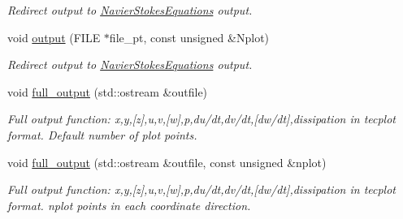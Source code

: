 \begin{DoxyCompactItemize}
\begin{DoxyCompactList}\small\item\em Redirect output to \hyperlink{classoomph_1_1NavierStokesEquations}{Navier\+Stokes\+Equations} output. \end{DoxyCompactList}\item 
void \hyperlink{classoomph_1_1PolarCrouzeixRaviartElement_a0e5c165c36dacf83709bd8c6fba1be40}{output} (F\+I\+LE $\ast$file\+\_\+pt, const unsigned \&Nplot)
\begin{DoxyCompactList}\small\item\em Redirect output to \hyperlink{classoomph_1_1NavierStokesEquations}{Navier\+Stokes\+Equations} output. \end{DoxyCompactList}\item 
void \hyperlink{classoomph_1_1PolarCrouzeixRaviartElement_afbc0b41da46fa27fa5cd35d9b38de2e1}{full\+\_\+output} (std\+::ostream \&outfile)
\begin{DoxyCompactList}\small\item\em Full output function\+: x,y,\mbox{[}z\mbox{]},u,v,\mbox{[}w\mbox{]},p,du/dt,dv/dt,\mbox{[}dw/dt\mbox{]},dissipation in tecplot format. Default number of plot points. \end{DoxyCompactList}\item 
void \hyperlink{classoomph_1_1PolarCrouzeixRaviartElement_a92da79ca7ed2c314650ad5a54b7878e8}{full\+\_\+output} (std\+::ostream \&outfile, const unsigned \&nplot)
\begin{DoxyCompactList}\small\item\em Full output function\+: x,y,\mbox{[}z\mbox{]},u,v,\mbox{[}w\mbox{]},p,du/dt,dv/dt,\mbox{[}dw/dt\mbox{]},dissipation in tecplot format. nplot points in each coordinate direction. \end{DoxyCompactList}\end{DoxyCompactItemize}
